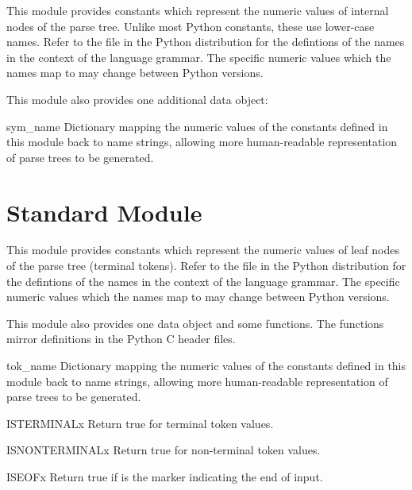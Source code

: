 This module provides constants which represent the numeric values of
internal nodes of the parse tree.  Unlike most Python constants, these
use lower-case names.  Refer to the file  in the
Python distribution for the defintions of the names in the context of
the language grammar.  The specific numeric values which the names map
to may change between Python versions.

This module also provides one additional data object:

\renewcommand{\indexsubitem}{(in module symbol)}


\begin{datadesc}{sym_name}
Dictionary mapping the numeric values of the constants defined in this
module back to name strings, allowing more human-readable
representation of parse trees to be generated.
\end{datadesc}

\begin{seealso}
\end{seealso}


\section{Standard Module }
\label{module-token}

This module provides constants which represent the numeric values of
leaf nodes of the parse tree (terminal tokens).  Refer to the file
 in the Python distribution for the defintions
of the names in the context of the language grammar.  The specific
numeric values which the names map to may change between Python
versions.

This module also provides one data object and some functions.  The
functions mirror definitions in the Python C header files.

\renewcommand{\indexsubitem}{(in module token)}


\begin{datadesc}{tok_name}
Dictionary mapping the numeric values of the constants defined in this
module back to name strings, allowing more human-readable
representation of parse trees to be generated.
\end{datadesc}

\begin{funcdesc}{ISTERMINAL}{x}
Return true for terminal token values.
\end{funcdesc}

\begin{funcdesc}{ISNONTERMINAL}{x}
Return true for non-terminal token values.
\end{funcdesc}

\begin{funcdesc}{ISEOF}{x}
Return true if  is the marker indicating the end of input.
\end{funcdesc}

\begin{seealso}
\end{seealso}
